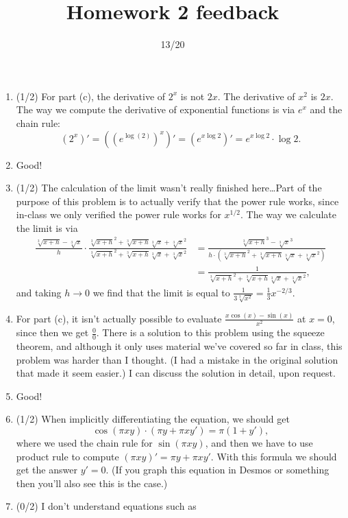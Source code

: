 \documentclass{article}
\title{Homework 2 feedback}
\author{13/20}
\date{}
\begin{document}
\maketitle
\begin{enumerate}
	\item (1/2) For part (c), the derivative of $2^{x}$ is not $2x$. The derivative of $x^{2}$ is $2x$. The way we compute the derivative of exponential functions is via $e^{x}$ and the chain rule:
		\[
			(2^{x})' = ( (e^{\log(2)})^{x} )' = (e^{x \log 2})' = e^{x \log 2} \cdot \log 2.
		\]
	\item Good!	
	\item (1/2) The calculation of the limit wasn't really finished here\ldots Part of the purpose of this problem is to actually verify that the power rule works, since in-class we only verified the power rule works for $x^{1/2}$. The way we calculate the limit is via
		\begin{align*}
		\frac{\sqrt[3]{x+h} - \sqrt[3]{x}}{h} \cdot \frac{\sqrt[3]{x+h}^{2} + \sqrt[3]{x+h} \sqrt[3]{x} + \sqrt[3]{x}^{2}}{\sqrt[3]{x+h}^{2} + \sqrt[3]{x+h} \sqrt[3]{x} + \sqrt[3]{x}^{2}} &= \frac{\sqrt[3]{x+h}^{3} - \sqrt[3]{x}^{3}}{h \cdot (\sqrt[3]{x+h}^{2} + \sqrt[3]{x+h} \sqrt[3]{x} + \sqrt[3]{x}^{2})}\\
		&= \frac{1}{\sqrt[3]{x+h}^{2} + \sqrt[3]{x+h} \sqrt[3]{x} + \sqrt[3]{x}^{2}},
		\end{align*}
		and taking $h \to 0$ we find that the limit is equal to $\frac{1}{3 \sqrt[3]{x^{2}}} = \frac{1}{3} x^{-2/3}$.
	\item For part (c), it isn't actually possible to evaluate $\frac{x \cos(x) - \sin(x)}{x^{2}}$ at $x = 0$, since then we get $\frac{0}{0}$. There is a solution to this problem using the squeeze theorem, and although it only uses material we've covered so far in class, this problem was harder than I thought. (I had a mistake in the original solution that made it seem easier.) I can discuss the solution in detail, upon request.
	\item Good!
	\item (1/2) When implicitly differentiating the equation, we should get
		\[
			\cos(\pi xy) \cdot (\pi y + \pi x y') = \pi(1 + y'),
		\]
		where we used the chain rule for $\sin(\pi xy)$, and then we have to use product rule to compute $(\pi xy)' = \pi y + \pi x y'$. With this formula we should get the answer $y' = 0$. (If you graph this equation in Desmos or something then you'll also see this is the case.)
	\item (0/2) I don't understand equations such as 

\end{enumerate}
\end{document}
